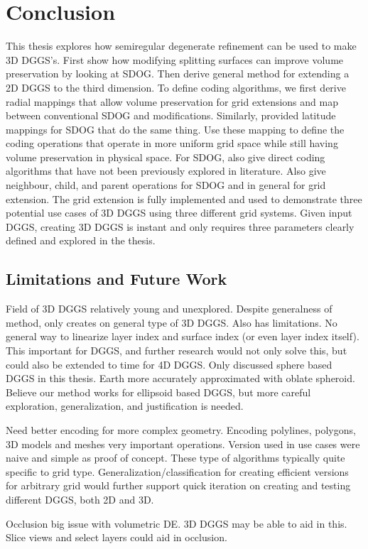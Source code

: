 \chapter{Conclusion} \label{chap:conclusion}
This thesis explores how semiregular degenerate refinement can be used to make 3D DGGS's.
First show how modifying splitting surfaces can improve volume preservation by looking at SDOG.
Then derive general method for extending a 2D DGGS to the third dimension.
To define coding algorithms, we first derive radial mappings that allow volume preservation for grid extensions and map between conventional SDOG and modifications.
Similarly, provided latitude mappings for SDOG that do the same thing.
Use these mapping to define the coding operations that operate in more uniform grid space while still having volume preservation in physical space.
For SDOG, also give direct coding algorithms that have not been previously explored in literature.
Also give neighbour, child, and parent operations for SDOG and in general for grid extension.
The grid extension is fully implemented and used to demonstrate three potential use cases of 3D DGGS using three different grid systems.
Given input DGGS, creating 3D DGGS is instant and only requires three parameters clearly defined and explored in the thesis.


\section{Limitations and Future Work}
Field of 3D DGGS relatively young and unexplored.
Despite generalness of method, only creates on general type of 3D DGGS.
Also has limitations.
No general way to linearize layer index and surface index (or even layer index itself).
This important for DGGS, and further research would not only solve this, but could also be extended to time for 4D DGGS.
Only discussed sphere based DGGS in this thesis.
Earth more accurately approximated with oblate spheroid.
Believe our method works for ellipsoid based DGGS, but more careful exploration, generalization, and justification is needed.


Need better encoding for more complex geometry.
Encoding polylines, polygons, 3D models and meshes very important operations.
Version used in use cases were naive and simple as proof of concept.
These type of algorithms typically quite specific to grid type.
Generalization/classification for creating efficient versions for arbitrary grid would further support quick iteration on creating and testing different DGGS, both 2D and 3D.


Occlusion big issue with volumetric DE.
3D DGGS may be able to aid in this.
Slice views and select layers could aid in occlusion.


